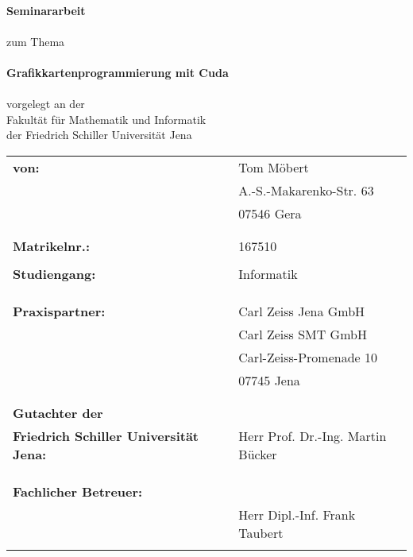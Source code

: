\documentclass[a4paper,oneside,numbers=noenddot,fontsize=12pt,open=right]{scrreprt}
\title{\thema}
\def \author{Tom Möbert}
\def \matrikelnummer{167510}
\def \betrieb{Carl Zeiss SMT GmbH}
\def \hochschule{Friedrich Schiller Universität Jena}
\def \hochschuleGenitivS{\hochschule}
\def \fmi{Fakultät für Mathematik und Informatik}
\def \studiengang{Informatik}
\def \arbeit{Seminararbeit}
\def \thema{Grafikkartenprogrammierung mit Cuda}
\begin{document}
\begin{titlepage}
    \begin{center}
    ~\vspace{1cm}\\
   {\fontsize{35}{45}\selectfont \textbf{\MakeUppercase \arbeit}}\\
    ~\vspace{0.5cm}\\
    zum Thema\\
    ~\vspace{0.5cm}\\
    \textbf{\glqq\thema\grqq}\\
    ~\vspace{0.5cm}\\
    vorgelegt an der\\
    {\fmi}\\
    {der \hochschuleGenitivS}
    \vspace{2cm}

 \normalsize{
    \begin{tabular}{lrl}
    	\textbf{von:} &~& {\author} \\
    	&~& A.-S.-Makarenko-Str. 63 \\
    	&~& 07546 Gera \\ \\ \\
    	\textbf{Matrikelnr.:}&~& {\matrikelnummer} \\ \\
    	\textbf{Studiengang:} &~& {\studiengang} \\ \\ \\ \\
    	\textbf{Praxispartner:} &~& Carl Zeiss Jena GmbH \\
    	&~& {\betrieb} \\
    	&~& {Carl-Zeiss-Promenade 10} \\
		&~& {07745 Jena} \\ \\ \\
		\textbf{Gutachter der }\\ \textbf{\hochschule:} &~& Herr Prof. Dr.-Ing. Martin Bücker \\ \\ \\ \\
    	\textbf{Fachlicher Betreuer:}\\ &~& Herr Dipl.-Inf. Frank Taubert \\ \\
    \end{tabular}\\
    }
  \end{center}
\end{titlepage}
\end{document}
